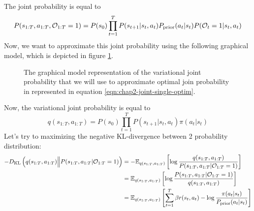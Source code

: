 The joint probability is equal to
\begin{equation}
\label{eqn:chap2-joint-single-optim}
    P(s_{1:T}, a_{1:T}, \mathcal{O}_{1:T} = 1) = P(s_0) \prod^{T}_{t=1} P(s_{t+1} | s_t, a_t) P_{\text{prior}}(a_t | s_t) P(\mathcal{O}_t = 1 | s_t, a_t)
\end{equation}
Now, we want to approximate this joint probability using the following graphical model, which is depicted in figure \ref{fig:chap2-single-graphical-approx}.
\begin{figure}[ht]
    \begin{minipage}[t]{0.5\linewidth}
    \centering
    \end{minipage}%
    \begin{minipage}[t]{0.5\linewidth}
    \caption{The graphical model representation of the variational joint probability that we will use to approximate optimal join probability in represented in equation \ref{eqn:chap2-joint-single-optim}. }
    \label{fig:chap2-single-graphical-approx}
    \end{minipage}
\end{figure}
Now, the variational joint probability is equal to 
\begin{equation}
    q(s_{1:T}, a_{1:T}) = P(s_0) \prod^{T}_{t=1} P(s_{t+1} | s_t, a_t) \pi(a_t | s_t) 
\end{equation}
Let's try to maximizing the negative KL-divergence between 2 probability distribution:
\begin{equation}
\begin{aligned}
    -D_{\mathrm{KL}}\left( q(s_{1:T}, a_{1:T}) \Big\| P(s_{1:T}, a_{1:T} | \mathcal{O}_{1:T} = 1) \right) &= -\mathbb{E}_{q(s_{1:T}, a_{1:T})}\left[ \log\frac{q(s_{1:T}, a_{1:T})}{P(s_{1:T}, a_{1:T} | \mathcal{O}_{1:T} = 1)} \right] \\
    &=\mathbb{E}_{q(s_{1:T}, a_{1:T})}\left[ \log\frac{P(s_{1:T}, a_{1:T} | \mathcal{O}_{1:T} = 1)}{q(s_{1:T}, a_{1:T})} \right] \\
    &= \mathbb{E}_{q(s_{1:T}, a_{1:T})} \left[ \sum^{T}_{t=1} \beta r(s_t, a_t) - \log \frac{\pi(a_t | s_t)}{P_{\text{prior}}(a_t | s_t)}  \right]
\end{aligned}
\end{equation}
